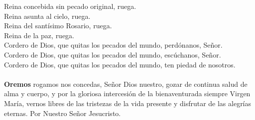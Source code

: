 \documentclass[./L00_main.tex]{subfiles}
\begin{document}
\begin{minipage}[t]{0.475\textwidth}
    Reina concebida sin pecado original, ruega.\\
    Reina asunta al cielo, ruega.\\
    Reina del santísimo Rosario, ruega.\\
    Reina de la paz, ruega.\\
    Cordero de Dios, que quitas los pecados del mundo, perdónanos, Señor.\\
    Cordero de Dios, que quitas los pecados del mundo, escúchanos, Señor.\\
    Cordero de Dios, que quitas los pecados del mundo, ten piedad de nosotros.\\
    \ruegapornosotrossalve\\

    \textbf{Oremos}
     rogamos nos concedas, Señor Dios nuestro, gozar de continua salud de alma y cuerpo, y por la gloriosa intercesión de la 
    bienaventurada siempre Virgen María, vernos libres de las tristezas de la vida presente y disfrutar de las alegrías eternas.
    Por Nuestro Señor Jesucristo. \\
\end{minipage}
\end{document}
